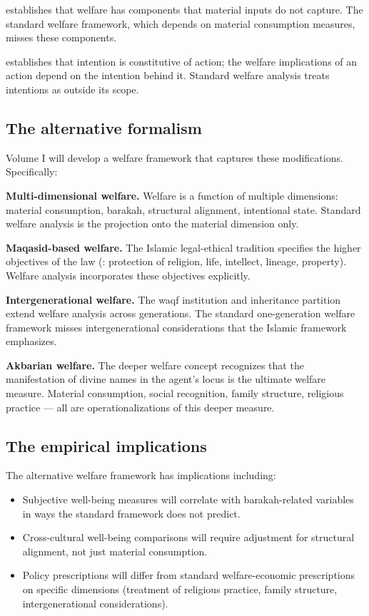  establishes that welfare has components that
material inputs do not capture. The standard welfare framework,
which depends on material consumption measures, misses these
components.

 establishes that intention is
constitutive of action; the welfare implications of an action
depend on the intention behind it. Standard welfare analysis
treats intentions as outside its scope.

\subsection{The alternative formalism}

Volume I will develop a welfare framework that captures these
modifications. Specifically:

\textbf{Multi-dimensional welfare.} Welfare is a function of
multiple dimensions: material consumption, barakah, structural
alignment, intentional state. Standard welfare analysis is the
projection onto the material dimension only.

\textbf{Maqasid-based welfare.} The Islamic legal-ethical
tradition specifies the higher objectives of the law
(: protection of religion, life,
intellect, lineage, property). Welfare analysis incorporates
these objectives explicitly.

\textbf{Intergenerational welfare.} The waqf institution and
inheritance partition extend welfare analysis across generations.
The standard one-generation welfare framework misses
intergenerational considerations that the Islamic framework
emphasizes.

\textbf{Akbarian welfare.} The deeper welfare concept recognizes
that the manifestation of divine names in the agent's locus is
the ultimate welfare measure. Material consumption, social
recognition, family structure, religious practice --- all are
operationalizations of this deeper measure.

\subsection{The empirical implications}

The alternative welfare framework has implications including:

\begin{itemize}[leftmargin=2em]
    \item Subjective well-being measures will correlate with
    barakah-related variables in ways the standard framework does
    not predict.
    \item Cross-cultural well-being comparisons will require
    adjustment for structural alignment, not just material
    consumption.
    \item Policy prescriptions will differ from standard
    welfare-economic prescriptions on specific dimensions
    (treatment of religious practice, family structure,
    intergenerational considerations).
\end{itemize}

